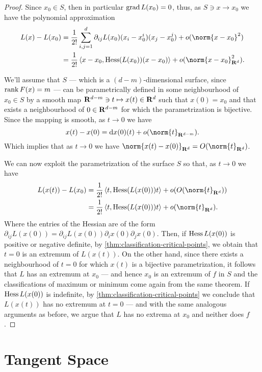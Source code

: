\begin{proof}
  Since \(x_0 \in S\), then in particular \(\operatorname{grad} L(x_0) = 0\), thus, as \(S \ni x \to
  x_0\) we have the polynomial approximation
  \begin{align*}
    L(x) - L(x_0)
    &= \frac{1}{2!} \sum_{i, j = 1}^{d} \partial_{i j} L(x_0) (x_i - x_0^i) (x_j - x_0^j)
    + o(\norm{x - x_0}^2) \\
    &= \frac{1}{2!} \left\langle x - x_{0}, \Hess(L(x_0)) (x - x_0) \right\rangle
    + o(\norm{x - x_0}_{\R^d}^2).
  \end{align*}

  We'll assume that \(S\) --- which is a \((d - m)\)-dimensional surface, since
  \(\operatorname{rank} F(x) = m\) --- can be parametrically defined in some neighbourhood of
  \(x_0 \in S\) by a smooth map \(\mathbf{R}^{d - m} \ni t \mapsto x(t) \in \mathbf{R}^d\) such that \(x(0)
  = x_0\) and that exists a neighbourhood of \(0 \in \mathbf{R}^{d-m}\) for which the
  parametrization is bijective. Since the mapping is smooth, as \(t \to 0\) we
  have
  \[
    x(t) - x(0) = \diff x(0)(t) + o(\norm{t}_{\R^{d-m}}).
  \]
  Which implies that as \(t \to 0\) we have \(\norm{x(t) - x(0)}_{\R^d} =
  O(\norm{t}_{\R^{d}})\).

  We can now exploit the parametrization of the surface \(S\) so that, as \(t \to
  0\) we have
  \begin{align*}
    L(x(t)) - L(x_0)
    &= \frac{1}{2!} \left\langle t, \Hess(L(x(0))) t \right\rangle +
    o(O(\norm{t}_{\R^d})) \\
    &= \frac{1}{2!} \left\langle t, \Hess(L(x(0))) t \right\rangle +
    o(\norm{t}_{\R^d}).
  \end{align*}
  Where the entries of the Hessian are of the form \(\partial_{ij} L(x(0)) = \partial_{i j}
  L(x(0)) \partial_i x(0) \partial_j x(0)\). Then, if \(\operatorname{Hess} L(x(0))\) is positive or negative
  definite, by \cref{thm:classification-critical-points}, we obtain that \(t =
  0\) is an extremum of \(L(x(t))\). On the other hand, since there exists a
  neighbourhood of \(t = 0\) for which \(x(t)\) is a bijective parametrization,
  it follows that \(L\) has an extremum at \(x_0\) --- and hence \(x_0\) is an
  extremum of \(f\) in \(S\) and the classifications of maximum or minimum come
  again from the same theorem. If \(\operatorname{Hess} L(x(0))\) is indefinite, by
  \cref{thm:classification-critical-points} we conclude that \(L(x(t))\) has no
  extremum at \(t = 0\) --- and with the same analogous arguments as before, we
  argue that \(L\) has no extrema at \(x_0\) and neither does \(f\).
\end{proof}

\section{Tangent Space}

